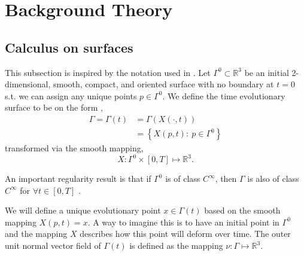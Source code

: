 

\section{Background Theory}%
\label{sec:background}


\subsection{ Calculus on surfaces}%
\label{sub:differential_calculus}

This subsection is inspired by the notation used in \cite{kovacs2021convergent, dougan2012first}.
Let $\Gamma^{0} \subset \mathbb{R} ^3  $ be an initial 2-dimensional, smooth, compact, and oriented surface with no boundary at $t=0$ s.t. we can assign any unique points $p \in \Gamma ^{0}$. We define the time evolutionary surface to be on the form \cite[Section 2.1]{kovacs2021convergent},
\[
    \begin{split}
\Gamma  = \Gamma \left( t \right) & = \Gamma \left( X \left(\cdot ,t \right)  \right) \\
                                  &= \left\{ X \left( p,t \right): \ p \in \Gamma^{0}  \right\}
    \end{split}
\]
transformed via the smooth mapping,
\[
X : \Gamma^{0} \times  \left[ 0,T \right]  \mapsto  \mathbb{R} ^3.
\]

An important regularity result is that if $\Gamma ^{0}$ is of class $C^{\infty}$, then $\Gamma $ is also of class $C^{\infty}$ for $\forall t \in \left[ 0,T \right] $ \cite{sokolowski1992introduction, dougan2012first}.

We will define a unique evolutionary point $x \in \Gamma \left( t \right) $ based on the smooth mapping $X \left( p,t \right) = x$. A way to imagine this is to have an initial point in $\Gamma ^{0}$ and the mapping $X $ describes how this point will deform over time. The outer unit normal vector field of $\Gamma \left( t \right) $ is defined as the mapping $\nu : \Gamma \mapsto
\mathbb{R} ^{3}$.

